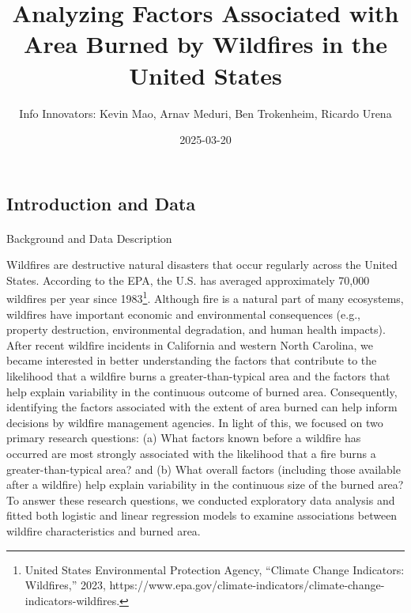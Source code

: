 \documentclass[
  letterpaper,
  DIV=11,
  numbers=noendperiod]{scrartcl}
\title{Analyzing Factors Associated with Area Burned by Wildfires in the
United States}
\author{Info Innovators: Kevin Mao, Arnav Meduri, Ben Trokenheim,
Ricardo Urena}
\date{2025-03-20}
\makeatletter
\let\oldparagraph\paragraph
\renewcommand{\paragraph}{
    \@ifstar
      \xxxParagraphStar
      \xxxParagraphNoStar
  }
\newcommand{\xxxParagraphStar}[1]{\oldparagraph*{#1}\mbox{}}
\newcommand{\xxxParagraphNoStar}[1]{\oldparagraph{#1}\mbox{}}
\makeatother
\begin{document}
\maketitle


\subsection{Introduction and Data}\label{introduction-and-data}

\paragraph{Background and Data
Description}\label{background-and-data-description}

Wildfires are destructive natural disasters that occur regularly across
the United States. According to the EPA, the U.S. has averaged
approximately 70,000 wildfires per year since 1983\footnote{United
  States Environmental Protection Agency, ``Climate Change Indicators:
  Wildfires,'' 2023,
  https://www.epa.gov/climate-indicators/climate-change-indicators-wildfires.}.
Although fire is a natural part of many ecosystems, wildfires have
important economic and environmental consequences (e.g., property
destruction, environmental degradation, and human health impacts). After
recent wildfire incidents in California and western North Carolina, we
became interested in better understanding the factors that contribute to
the likelihood that a wildfire burns a greater-than-typical area and the
factors that help explain variability in the continuous outcome of
burned area. Consequently, identifying the factors associated with the
extent of area burned can help inform decisions by wildfire management
agencies. In light of this, we focused on two primary research
questions: (a) What factors known before a wildfire has occurred are
most strongly associated with the likelihood that a fire burns a
greater-than-typical area? and (b) What overall factors (including those
available after a wildfire) help explain variability in the continuous
size of the burned area? To answer these research questions, we
conducted exploratory data analysis and fitted both logistic and linear
regression models to examine associations between wildfire
characteristics and burned area.
\end{document}
